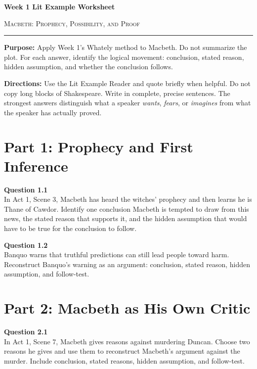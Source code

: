 \documentclass[12pt]{article}
\begin{document}
\begin{center}
{\LARGE\bfseries Week 1 Lit Example Worksheet}\par\vspace{0.05em}
{\large\scshape Macbeth: Prophecy, Possibility, and Proof}\par\vspace{0.12em}
\rule{0.78\textwidth}{0.5pt}
\end{center}

\textbf{Purpose:} Apply Week 1's Whately method to Macbeth. Do not summarize the plot. For each answer, identify the logical movement: conclusion, stated reason, hidden assumption, and whether the conclusion follows.

\textbf{Directions:} Use the Lit Example Reader and quote briefly when helpful. Do not copy long blocks of Shakespeare. Write in complete, precise sentences. The strongest answers distinguish what a speaker \textit{wants}, \textit{fears}, or \textit{imagines} from what the speaker has actually proved.

\section*{Part 1: Prophecy and First Inference}

\textbf{Question 1.1}\\[-0.15em]
In Act 1, Scene 3, Macbeth has heard the witches' prophecy and then learns he is Thane of Cawdor. Identify one conclusion Macbeth is tempted to draw from this news, the stated reason that supports it, and the hidden assumption that would have to be true for the conclusion to follow.


\newpage

\textbf{Question 1.2}\\[-0.15em]
Banquo warns that truthful predictions can still lead people toward harm. Reconstruct Banquo's warning as an argument: conclusion, stated reason, hidden assumption, and follow-test.


\newpage

\section*{Part 2: Macbeth as His Own Critic}

\textbf{Question 2.1}\\[-0.15em]
In Act 1, Scene 7, Macbeth gives reasons against murdering Duncan. Choose two reasons he gives and use them to reconstruct Macbeth's argument against the murder. Include conclusion, stated reasons, hidden assumption, and follow-test.
\end{document}
